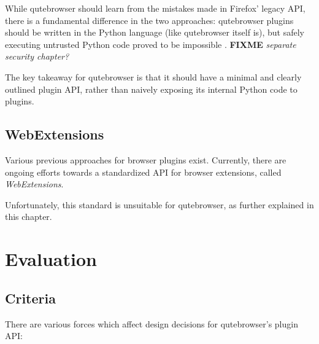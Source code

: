 \documentclass[a4paper,parskip=full]{scrreprt}
\newcommand{\fixme}[1]{\textbf{FIXME} \emph{#1}}
\begin{document}
While qutebrowser should learn from the mistakes made in Firefox' legacy API,
there is a fundamental difference in the two approaches: qutebrowser plugins
should be written in the Python language (like qutebrowser itself is), but
safely executing untrusted Python code proved to be impossible
\citep{nedbat-eval, lwn-pysandbox}. \fixme{separate security chapter?}

The key takeaway for qutebrowser is that it should have a minimal and clearly
outlined plugin API, rather than naively exposing its internal Python code to
plugins.

\section{WebExtensions}

Various previous approaches for browser plugins exist. Currently, there are
ongoing efforts towards a standardized API for browser extensions, called
\emph{WebExtensions}.

Unfortunately, this standard is unsuitable for qutebrowser, as further explained
in this chapter.





\chapter{Evaluation}

\section{Criteria}

There are various forces which affect design decisions for qutebrowser's plugin
API:
\end{document}
